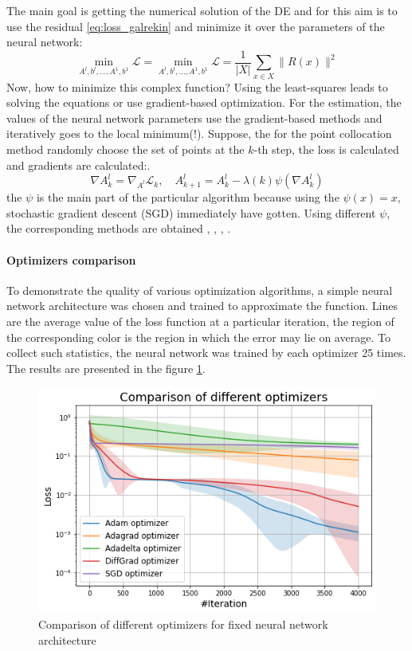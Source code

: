 The main goal is getting the numerical solution of the DE and for this aim is to use the residual \eqref{eq:loss_galrekin} and minimize it over the parameters of the neural network:
\begin{equation*}
	\min_{A^l, b^l, \dots, A^1, b^1} \mathcal{L} = \min_{A^l, b^l, \dots, A^1, b^1} \mathcal{L} = \dfrac{1}{| X |} \sum_{x \in X} \| R(x) \|^2
\end{equation*}
Now, how to minimize this complex function? Using the least-squares leads to solving the equations or use gradient-based optimization. For the estimation, the values of the neural network parameters use the gradient-based methods and iteratively goes to the local minimum(!). Suppose, the for the point collocation method randomly choose the set of points at the $k$-th step, the loss is calculated and gradients are calculated:.
\begin{equation}
	\nabla A_k^l = \nabla_{A^l} \mathcal{L}_k, \quad A_{k + 1}^l = A_k^l - \lambda(k) \psi(\nabla A_k^l)
\end{equation}
the $\psi$ is the main part of the particular algorithm because using the $\psi(x) = x$, stochastic gradient descent (SGD) immediately have gotten. Using different $\psi$, the corresponding methods are obtained \cite{Adadelta}, \cite{Adagrad}, \cite{Adam}, \cite{Diffgrad}.
\paragraph{Optimizers comparison}
To demonstrate the quality of various optimization algorithms, a simple neural network architecture was chosen and trained to approximate the function. Lines are the average value of the loss function at a particular iteration, the region of the corresponding color is the region in which the error may lie on average. To collect such statistics, the neural network was trained by each optimizer 25 times.
The results are presented in the figure \ref{fig:optimizers}.
\begin{figure}[h]
	\centering
	\includegraphics[width=\textwidth]{images/chapter2/optimizers.png}
	\caption{Comparison of different optimizers for fixed neural network architecture}
	\label{fig:optimizers}
\end{figure}


